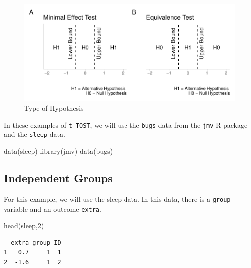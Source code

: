 \documentclass[
]{interact}
\newenvironment{Shaded}{\begin{snugshade}}{\end{snugshade}}
\newcommand{\DecValTok}[1]{\textcolor[rgb]{0.68,0.00,0.00}{#1}}
\newcommand{\FunctionTok}[1]{\textcolor[rgb]{0.28,0.35,0.67}{#1}}
\newcommand{\NormalTok}[1]{\textcolor[rgb]{0.00,0.23,0.31}{#1}}
\newcommand{\StringTok}[1]{\textcolor[rgb]{0.13,0.47,0.30}{#1}}
\begin{document}
\begin{figure}[H]

{\centering \includegraphics{avocado-quarto_files/figure-pdf/hypplot-1.pdf}

}

\caption{Type of Hypothesis}

\end{figure}

In these examples of \texttt{t\_TOST}, we will use the \texttt{bugs}
data from the \texttt{jmv} R package and the \texttt{sleep} data.

\begin{Shaded}
\begin{Highlighting}[]
\FunctionTok{data}\NormalTok{(}\StringTok{\textquotesingle{}sleep\textquotesingle{}}\NormalTok{)}
\FunctionTok{library}\NormalTok{(jmv)}
\FunctionTok{data}\NormalTok{(}\StringTok{\textquotesingle{}bugs\textquotesingle{}}\NormalTok{)}
\end{Highlighting}
\end{Shaded}

\hypertarget{independent-groups}{%
\subsection{Independent Groups}\label{independent-groups}}

For this example, we will use the sleep data. In this data, there is a
\texttt{group} variable and an outcome \texttt{extra}.

\begin{Shaded}
\begin{Highlighting}[]
\FunctionTok{head}\NormalTok{(sleep,}\DecValTok{2}\NormalTok{)}
\end{Highlighting}
\end{Shaded}

\begin{verbatim}
  extra group ID
1   0.7     1  1
2  -1.6     1  2
\end{verbatim}
\end{document}

